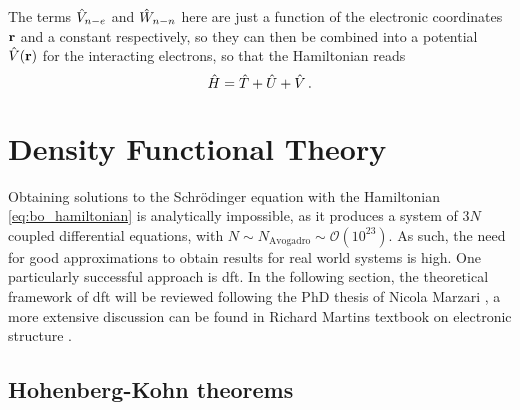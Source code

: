 \documentclass[main.tex]{subfiles}
\begin{document}
The terms \(\hat{V}_{n-e}\) and \(\hat{W}_{n-n}\) here are just a function of the electronic coordinates \(\vb{r}\) and a constant respectively, so they can then be combined into a potential \(\hat{V} (\vb{r})\) for the interacting electrons, so that the Hamiltonian reads
\begin{equation}\label{eq:solid_state_hamiltonian}
    \hat{H} = \hat{T} + \hat{U} + \hat{V}\,.
\end{equation}

\section{Density Functional Theory\label{sec:theory_dft}}

Obtaining solutions to the Schrödinger equation with the Hamiltonian \ref{eq:bo_hamiltonian} is analytically impossible, as it produces a system of \(3N\) coupled differential equations, with \(N \sim N_{\mathrm{Avogadro}} \sim \mathcal{O} (10^{23})\).
As such, the need for good approximations to obtain results for real world
systems is high.
One particularly successful approach is \acrfull{dft}.
In the following section, the theoretical framework of \acrshort{dft} will be reviewed following the PhD thesis of Nicola Marzari \cite{marzari_ab-initio_1996}, a more extensive discussion can be found in Richard Martins textbook on electronic structure \cite{martin_electronic_2004}.

\subsection{Hohenberg-Kohn theorems}
\end{document}
